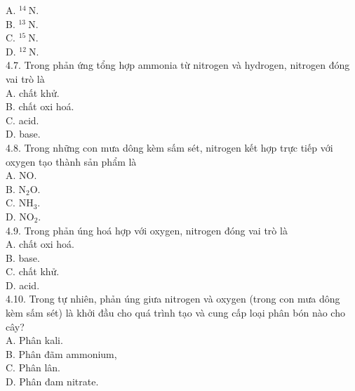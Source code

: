 \documentclass[10pt]{article}
\begin{document}
A. ${ }^{14} \mathrm{~N}$.\\
B. ${ }^{13} \mathrm{~N}$.\\
C. ${ }^{15} \mathrm{~N}$.\\
D. ${ }^{12} \mathrm{~N}$.\\
4.7. Trong phản ứng tổng hợp ammonia từ nitrogen và hydrogen, nitrogen đóng vai trò là\\
A. chất khử.\\
B. chất oxi hoá.\\
C. acid.\\
D. base.\\
4.8. Trong những con mưa dông kèm sấm sét, nitrogen kết hợp trực tiếp với oxygen tạo thành sản phẩm là\\
A. NO.\\
B. $\mathrm{N}_{2} \mathrm{O}$.\\
C. $\mathrm{NH}_{3}$.\\
D. $\mathrm{NO}_{2}$.\\
4.9. Trong phản úng hoá hợp với oxygen, nitrogen đóng vai trò là\\
A. chất oxi hoá.\\
B. base.\\
C. chất khử.\\
D. acid.\\
4.10. Trong tự nhiên, phản úng giưa nitrogen và oxygen (trong con mưa dông kèm sấm sét) là khởi đầu cho quá trình tạo và cung cấp loại phân bón nào cho cây?\\
A. Phân kali.\\
B. Phân đãm ammonium,\\
C. Phân lân.\\
D. Phân đam nitrate.
\end{document}
